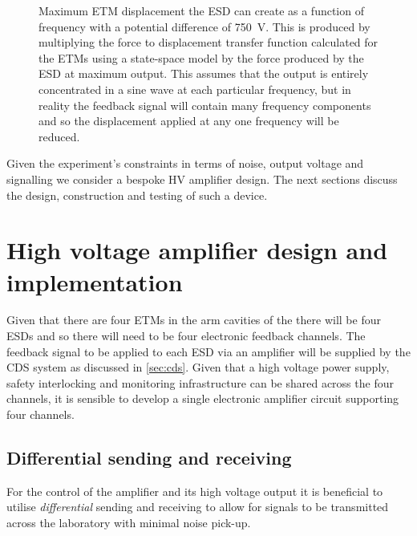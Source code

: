 \begin{figure}
  \centering
  
  \caption[Maximum end test mass displacement the electrostatic drive can create]{\label{fig:ssm-etm-disp-esd-max}Maximum \gls{ETM} displacement the \gls{ESD} can create as a function of frequency with a potential difference of \SI{750}{\volt}. This is produced by multiplying the force to displacement transfer function calculated for the \glspl{ETM} using a state-space model by the force produced by the \gls{ESD} at maximum output. This assumes that the output is entirely concentrated in a sine wave at each particular frequency, but in reality the feedback signal will contain many frequency components and so the displacement applied at any one frequency will be reduced.}
\end{figure}

Given the experiment's constraints in terms of noise, output voltage and signalling we consider a bespoke \gls{HV} amplifier design. The next sections discuss the design, construction and testing of such a device.

\section{\label{sec:hv-amplifier}High voltage amplifier design and implementation}
Given that there are four \glspl{ETM} in the arm cavities of the \SSMEXPT{} there will be four \glspl{ESD} and so there will need to be four electronic feedback channels. The feedback signal to be applied to each \gls{ESD} via an amplifier will be supplied by the \gls{CDS} system as discussed in \cref{sec:cds}. Given that a high voltage power supply, safety interlocking and monitoring infrastructure can be shared across the four channels, it is sensible to develop a single electronic amplifier circuit supporting four channels.

\subsection{Differential sending and receiving}
For the control of the amplifier and its high voltage output it is beneficial to utilise \emph{differential} sending and receiving to allow for signals to be transmitted across the laboratory with minimal noise pick-up.

